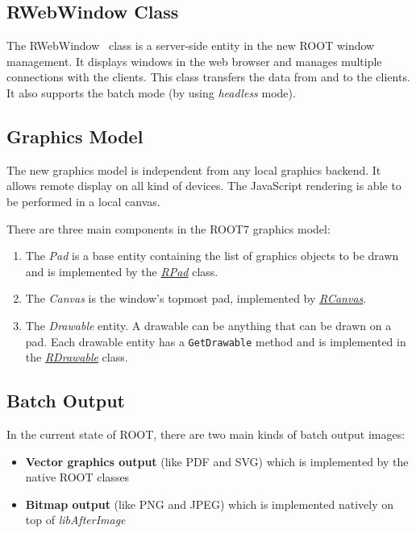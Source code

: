 \documentclass[a4paper]{jpconf}
\begin{document}
\subsection{RWebWindow Class}
The RWebWindow~\cite{rweb} class is a server-side entity in the new ROOT window management.
It displays windows in the web browser and manages multiple connections with the clients.
This class transfers the data from and to the clients. It also supports the batch
mode (by using \textit{headless} mode).

 \subsection{Graphics Model}
 The new graphics model is independent from any local graphics backend. It allows
 remote display on all kind of devices. The JavaScript rendering is able to be
 performed in a local canvas.

There are three main components in the ROOT7 graphics model:
\begin{enumerate}[label=\alph*)]
  \item The \textit{Pad} is a base entity containing the list of graphics objects to be drawn and is implemented by the \textit{\href{https://root.cern/doc/master/classROOT_1_1Experimental_1_1RPad.html}{RPad}} class.
  \item The \textit{Canvas} is the window's topmost pad, implemented by \textit{\href{https://root.cern/doc/master/classROOT_1_1Experimental_1_1RCanvas.html}{RCanvas}}.
  \item The \textit{Drawable} entity. A drawable can be anything that can be drawn on a pad. Each drawable entity has a \texttt{GetDrawable} method and is implemented in the \textit{\href{https://root.cern/doc/master/classROOT_1_1Experimental_1_1RDrawable.html}{RDrawable}} class.
\end{enumerate}

\subsection{Batch Output}

In the current state of ROOT, there are two main kinds of batch output images:
\begin{itemize}
  \item \textbf{Vector graphics output} (like PDF and SVG) which is implemented by the native ROOT classes
  \item \textbf{Bitmap output} (like PNG and JPEG) which is implemented natively on top of \textit{libAfterImage}
\end{itemize}
\end{document}
